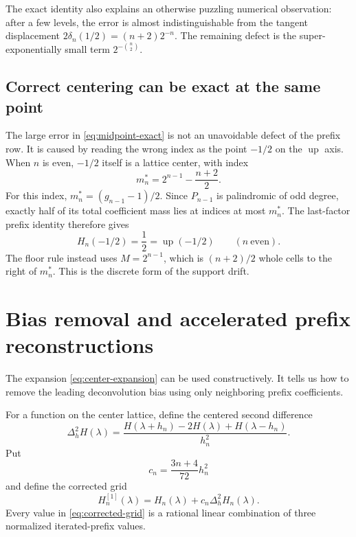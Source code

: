 \documentclass[11pt,oneside]{article}
\theoremstyle{definition}
\theoremstyle{remark}
\newcommand{\Up}{\operatorname{up}}
\newcommand{\Deltah}{\Delta_h}
\begin{document}
The exact identity also explains an otherwise puzzling numerical observation: after a few
levels, the error is almost indistinguishable from the tangent displacement
$2\delta_n(1/2)=(n+2)2^{-n}$.  The remaining defect is the super-exponentially small term
$2^{-\binom n2}$.

\subsection{Correct centering can be exact at the same point}

The large error in \eqref{eq:midpoint-exact} is not an unavoidable defect of the prefix row.
It is caused by reading the wrong index as the point $-1/2$ on the $\Up$ axis.  When $n$ is
even, $-1/2$ itself is a lattice center, with index
\begin{equation}
 m_n^*=2^{n-1}-\frac{n+2}{2}.                              \label{eq:midpoint-correct-index}
\end{equation}
For this index, $m_n^*=(g_{n-1}-1)/2$.  Since $P_{n-1}$ is palindromic of odd degree, exactly
half of its total coefficient mass lies at indices at most $m_n^*$.  The last-factor prefix
identity therefore gives
\begin{equation}
 H_n(-1/2)=\frac12=\Up(-1/2) \qquad(n\ \text{even}).       \label{eq:midpoint-centered-exact}
\end{equation}
The floor rule instead uses $M=2^{n-1}$, which is $(n+2)/2$ whole cells to the right of
$m_n^*$.  This is the discrete form of the support drift.

\section{Bias removal and accelerated prefix reconstructions}
\label{sec:acceleration}

The expansion \eqref{eq:center-expansion} can be used constructively.  It tells us how to
remove the leading deconvolution bias using only neighboring prefix coefficients.

For a function on the center lattice, define the centered second difference
\begin{equation}
 \Deltah^2H(\lambda)
 =\frac{H(\lambda+h_n)-2H(\lambda)+H(\lambda-h_n)}{h_n^2}. \label{eq:discrete-laplacian}
\end{equation}
Put
\begin{equation}
 c_n=\frac{3n+4}{72}h_n^2
\end{equation}
and define the corrected grid
\begin{equation}
 H_n^{[1]}(\lambda)=H_n(\lambda)+c_n\Deltah^2H_n(\lambda). \label{eq:corrected-grid}
\end{equation}
Every value in \eqref{eq:corrected-grid} is a rational linear combination of three normalized
iterated-prefix values.
\end{document}
